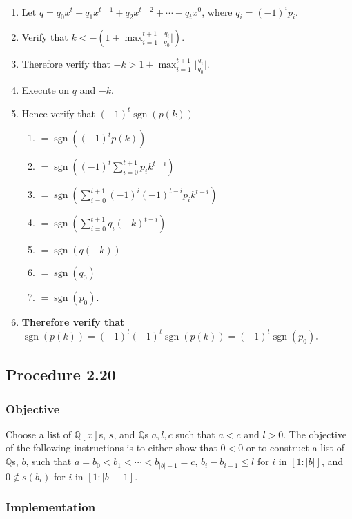\documentclass[twocolumn]{article}
\DeclareMathOperator{\sgn}{sgn}
\newcommand{\procedure}[2][]{\subsection*{Procedure #2 \ifthenelse{\equal{#1}{}}{}{(#1)}}\label{sec:procedure #2}}
\newcommand{\objective}{\subsubsection*{Objective}}
\newcommand{\implementation}{\subsubsection*{Implementation}}
\newcommand{\procedurehr}[2][]{\hyperref[sec:procedure #2]{\ifthenelse{\equal{#1}{}}{procedure #2}{#1}}}
\begin{document}
				\begin{enumerate}
					\item Let $q=q_0x^t+q_1x^{t-1}+q_2x^{t-2}+\cdots+q_tx^0$, where $q_i=(-1)^ip_i$.
					\item Verify that $k<-(1+\max_{i=1}^{t+1}\lvert\frac{q_i}{q_0}\rvert)$.
					\item Therefore verify that $-k>1+\max_{i=1}^{t+1}\lvert\frac{q_i}{q_0}\rvert$.
					\item Execute \procedurehr{2.18} on $q$ and $-k$.
					\item Hence verify that $(-1)^t\sgn(p(k))$
					\begin{enumerate}
						\item $=\sgn((-1)^tp(k))$
						\item $=\sgn((-1)^t\sum_{i=0}^{t+1} p_ik^{t-i})$
						\item $=\sgn(\sum_{i=0}^{t+1} (-1)^i(-1)^{t-i}p_ik^{t-i})$
						\item $=\sgn(\sum_{i=0}^{t+1} q_i(-k)^{t-i})$
						\item $=\sgn(q(-k))$
						\item $=\sgn(q_0)$
						\item $=\sgn(p_0)$.
					\end{enumerate}
					\item \textbf{Therefore verify that $\sgn(p(k))=(-1)^t(-1)^t\sgn(p(k))=(-1)^t\sgn(p_0)$.}
				\end{enumerate}
		\procedure{2.20}
			\objective
				Choose a list of $\mathbb{Q}[x]$s, $s$, and $\mathbb{Q}$s $a,l,c$ such that $a<c$ and $l>0$. The objective of the following instructions is to either show that $0<0$ or to construct a list of $\mathbb{Q}$s, $b$, such that $a=b_0<b_1<\cdots<b_{\lvert b\rvert-1}=c$, $b_{i}-b_{i-1}\le l$ for $i$ in $[1:\lvert b\rvert]$, and $0\not\in s(b_i)$ for $i$ in $[1:\lvert b\rvert-1]$.
			\implementation
\end{document}
